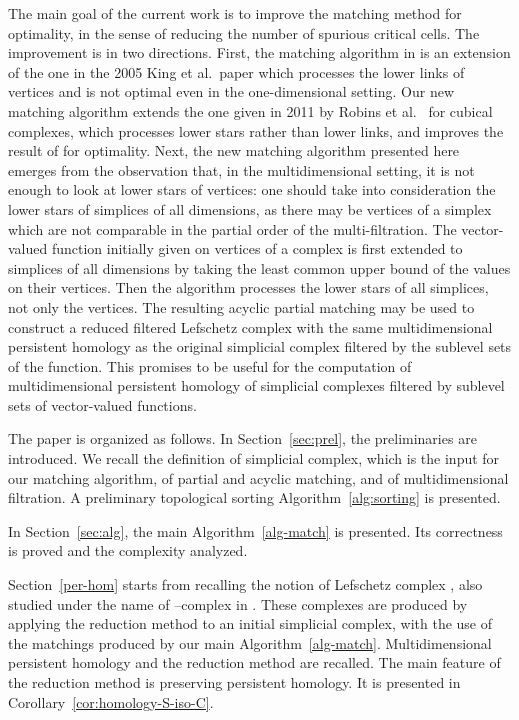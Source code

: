 \documentclass[12pt]{article}
\begin{document}
The main goal of the current work is to improve the matching method for optimality, in the sense of reducing the number of spurious critical cells. The improvement is in two directions. First, the matching algorithm in \cite{AlKaLa17} is an extension of the one in the 2005 King et al.\ paper \cite{KinKnuMra05} which processes the lower links of vertices and is not optimal even in the one-dimensional setting. Our new matching algorithm extends the one given in 2011 by Robins et al.\ \cite{RobWooShe11} for cubical complexes, which processes lower stars rather than lower links, and improves the result of \cite{KinKnuMra05} for optimality. Next, the new matching algorithm presented here emerges from the observation that, in the multidimensional setting, it is not enough to look at lower stars of vertices: one should take into consideration the lower stars of simplices of all dimensions, as there may be vertices of a simplex which are not comparable in the partial order of the multi-filtration. The vector-valued function initially given on vertices of a complex is first extended to simplices of all dimensions by taking the least common upper bound of the values on their vertices. Then the algorithm processes the lower stars of all simplices, not only the vertices. The resulting acyclic partial matching may be used to construct a reduced filtered Lefschetz complex with the same multidimensional persistent homology as the original simplicial complex filtered by the sublevel sets of the function. This promises to be useful for the computation of multidimensional persistent homology of  simplicial complexes filtered by  sublevel sets of vector-valued functions.

The paper is organized as follows. In Section~\ref{sec:prel}, the preliminaries are introduced. We recall the definition of simplicial complex, which is the input for our matching algorithm, of partial and acyclic matching, and of multidimensional filtration. A preliminary topological sorting Algorithm~\ref{alg:sorting} is presented.

In Section~\ref{sec:alg}, the main Algorithm~\ref{alg-match} is presented. Its correctness is proved and the complexity analyzed.

Section~\ref{per-hom} starts from recalling the notion of Lefschetz complex \cite{Lef42}, also studied under the name of --complex in \cite{MrBa09}. These complexes are produced by applying the reduction method \cite{KaMrSl98,MrBa09,MiNa} to an initial simplicial complex, with the use of the matchings produced by our main Algorithm~\ref{alg-match}. Multidimensional persistent homology and the reduction method are recalled. The main feature of the reduction method is preserving persistent homology. It is presented in Corollary~\ref{cor:homology-S-iso-C}.
\end{document}
